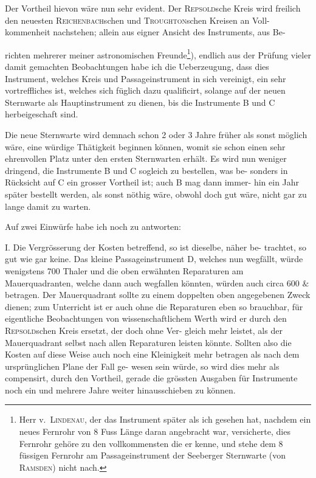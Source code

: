 \documentclass[12pt,a4paper]{article}
\theoremstyle{plain}
\theoremstyle{definition}
\theoremstyle{remark}
\begin{document}
Der Vortheil hievon w\"{a}re nun sehr evident. Der \textsc{Repsold}sche Kreis wird
freilich den neuesten \textsc{Reichenbach}schen und \textsc{Troughton}schen Kreisen an Voll-
kommenheit nachstehen; allein aus eigner Ansicht des Instruments, aus Be-

\newpage
\noindent
richten mehrerer meiner astronomischen Freunde\footnote{Herr v.\ \textsc{Lindenau}, der das Instrument sp\"{a}ter als ich gesehen hat, nachdem ein neues Fernrohr
von 8 Fuss L\"{a}nge daran angebracht war, versicherte, dies Fernrohr geh\"{o}re zu den vollkommensten die er
kenne, und stehe dem 8 f\"{u}ssigen Fernrohr am Passageinstrument der Seeberger Sternwarte (von \textsc{Ramsden})
nicht nach.}), endlich aus der Pr\"{u}fung
vieler damit gemachten Beobachtungen habe ich die Ueberzeugung, dass dies
Instrument, welches Kreis und Passageinstrument in sich vereinigt, ein sehr
vortreffliches ist, welches sich f\"{u}glich dazu qualificirt, solange auf der neuen
Sternwarte als Hauptinstrument zu dienen, bis die Instrumente B und C
herbeigeschaft sind.

Die neue Sternwarte wird demnach schon 2 oder 3 Jahre fr\"{u}her als sonst
m\"{o}glich w\"{a}re, eine w\"{u}rdige Th\"{a}tigkeit beginnen k\"{o}nnen, womit sie schon einen
sehr ehrenvollen Platz unter den ersten Sternwarten erh\"{a}lt. Es wird nun
weniger dringend, die Instrumente B und C sogleich zu bestellen, was be-
sonders in R\"{u}cksicht auf C ein grosser Vortheil ist; auch B mag dann immer-
hin ein Jahr sp\"{a}ter bestellt werden, als sonst n\"{o}thig w\"{a}re, obwohl doch gut
w\"{a}re, nicht gar zu lange damit zu warten.

Auf zwei Einw\"{u}rfe habe ich noch zu antworten:

I. Die Vergr\"{o}sserung der Kosten betreffend, so ist dieselbe, n\"{a}her be-
trachtet, so gut wie gar keine. Das kleine Passageinstrument D, welches nun
wegf\"{a}llt, w\"{u}rde wenigstens 700 Thaler und die oben erw\"{a}hnten Reparaturen
am Mauerquadranten, welche dann auch wegfallen k\"{o}nnten, w\"{u}rden
auch circa 600 $\mathit{\&}$ betragen. Der Mauerquadrant sollte zu einem doppelten oben
angegebenen Zweck dienen; zum Unterricht ist er auch ohne die Reparaturen
eben so brauchbar, f\"{u}r eigentliche Beobachtungen von wissenschaftlichem
Werth wird er durch den \textsc{Repsold}schen Kreis ersetzt, der doch ohne Ver-
gleich mehr leistet, als der Mauerquadrant selbst nach allen Reparaturen
leisten k\"{o}nnte. Sollten also die Kosten auf diese Weise auch noch eine
Kleinigkeit mehr betragen als nach dem urspr\"{u}nglichen Plane der Fall ge-
wesen sein w\"{u}rde, so wird dies mehr als compensirt, durch den Vortheil,
gerade die gr\"{o}ssten Ausgaben f\"{u}r Instrumente noch ein und mehrere Jahre
weiter hinausschieben zu k\"{o}nnen.
\end{document}
